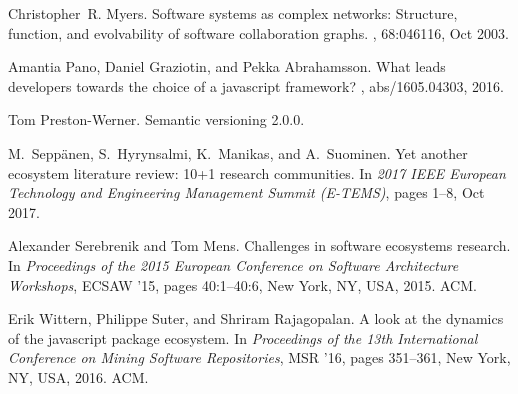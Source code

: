 \documentclass[10pt,conference]{IEEEtran}
\begin{document}
\begin{thebibliography}{10}
  Christopher~R. Myers.
  \newblock Software systems as complex networks: Structure, function, and
  evolvability of software collaboration graphs.
  , 68:046116, Oct 2003.

  Amantia Pano, Daniel Graziotin, and Pekka Abrahamsson.
  \newblock What leads developers towards the choice of a javascript framework?
  , abs/1605.04303, 2016.

  Tom Preston-Werner.
  \newblock Semantic versioning 2.0.0.

  M.~{Seppänen}, S.~{Hyrynsalmi}, K.~{Manikas}, and A.~{Suominen}.
  \newblock Yet another ecosystem literature review: 10+1 research communities.
  \newblock In {\em 2017 IEEE European Technology and Engineering Management
  Summit (E-TEMS)}, pages 1--8, Oct 2017.

  Alexander Serebrenik and Tom Mens.
  \newblock Challenges in software ecosystems research.
  \newblock In {\em Proceedings of the 2015 European Conference on Software
  Architecture Workshops}, ECSAW '15, pages 40:1--40:6, New York, NY, USA,
  2015. ACM.

  Erik Wittern, Philippe Suter, and Shriram Rajagopalan.
  \newblock A look at the dynamics of the javascript package ecosystem.
  \newblock In {\em Proceedings of the 13th International Conference on Mining
  Software Repositories}, MSR '16, pages 351--361, New York, NY, USA, 2016.
  ACM.

\end{thebibliography}

\vspace{12pt}
\end{document}
